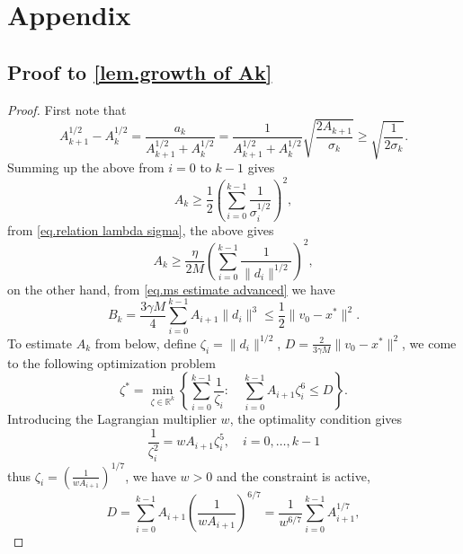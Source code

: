 \documentclass{article}
\begin{document}



\clearpage
\section*{Appendix}
\appendix
\subsection*{Proof to \autoref{lem.growth of Ak}}
\begin{proof}
    First note that
    \begin{equation*}
        A_{k+1}^{1/2}-A_k^{1/2} = \frac{a_k}{A_{k+1}^{1/2}+A_k^{1/2}}=\frac{1}{A_{k+1}^{1/2}+A_k^{1/2}}\sqrt{\frac{2A_{k+1}}{\sigma_k}}\geq \sqrt{\frac{1}{2\sigma_k}}.
    \end{equation*}
    Summing up the above from $i=0$ to $k-1$ gives 
    \begin{equation*}
        A_k \geq \frac{1}{2} \left (\sum_{i=0}^{k-1}\frac{1}{\sigma_i^{1/2}}\right)^2,
    \end{equation*}
    from \eqref{eq.relation lambda sigma}, the above gives
    \begin{equation}\label{eq.Ak helper 1}
        A_k \geq \frac{\eta}{2M} \left (\sum_{i=0}^{k-1} \frac{1}{\|d_i\|^{1/2}}\right)^2,
    \end{equation}
    on the other hand, from \eqref{eq.ms estimate advanced} we have
    \begin{equation*}
        B_k = \frac{3\gamma M}{4}\sum_{i=0}^{k-1} A_{i+1}\|d_i\|^3 \leq \frac{1}{2}\|v_0-x^*\|^2.
    \end{equation*}
    To estimate $A_k$ from below, define $\zeta_i = \|d_i\|^{1/2}$, $D = \frac{2}{3\gamma M}\|v_0-x^*\|^2$, we come to the following optimization problem
    \begin{equation*}
\zeta^*=\min _{\zeta \in \mathbb{R}^k}\left\{\sum_{i=0}^{k-1} \frac{1}{\zeta_i}: \quad \sum_{i=0}^{k-1} A_{i+1} \zeta_i^6 \leq D\right\}.
\end{equation*}
Introducing the Lagrangian multiplier $w$, the optimality condition gives 
\begin{equation*}
\frac{1}{\zeta_i^2}=w A_{i+1} \zeta_i^5, \quad i=0, \ldots, k-1
\end{equation*}
thus $\zeta_i = \left( \frac{1}{w A_{i+1}}\right)^{1/7}$, we have $w>0$ and the constraint is active, 
\begin{equation*}
D=\sum_{i=0}^{k-1} A_{i+1}\left(\frac{1}{w A_{i+1}}\right)^{6 / 7}=\frac{1}{w^{6 / 7}} \sum_{i=0}^{k-1} A_{i+1}^{1 / 7},

\end{equation*}
\end{proof}
\end{document}
